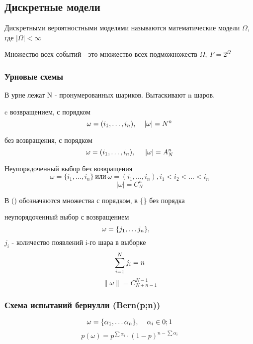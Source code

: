 \begin{multicols}{2}
    \subsection*{Дискретные модели}
    \begin{definition}{}{}
        Дискретными вероятностными моделями называются математические модели $\Omega$, где $ |\Omega|< \infty$
    \end{definition}
    Множество всех событий - это множество всех подможножеств $\Omega, \   F = 2^{\Omega}$
    \subsubsection*{Урновые схемы}
    В урне лежат N - пронумерованных шариков. Вытаскивают n шаров.
    \begin{enumerate*}
        \item c возвращением, с порядком
        \[
        \omega = (i_1,\ldots,i_n), \hspace*{0.4cm} |\omega| = N^n
        \]
        \item без возвращения, с порядком
        \[
        \omega = (i_1,\ldots,i_n), \hspace*{0.5cm} |\omega| = A_N^n
        \]
        \item Неупорядоченный выбор без возвращения
        \[  
        \omega = \{i_1,\ldots,i_n\}\ \text{или} \ \omega = (i_1,\ldots,i_n), i_1<i_2<...<i_n
        \]
        \[
        |\omega| = C_N^n
        \]
        \begin{note}
        В () обозначаются множества с порядком, в \{\} без порядка
        \end{note}
        \item неупорядоченный выбор с возвращением
        \[
        \omega = \{j_1,\ldots j_n\}, \hspace*{0.4cm}
        \]
        $j_i$ - количество появлений i-го шара в выборке
        \[
        \sum\limits_{i = 1}^{N} j_i = n
        \]
        \[
        \|\omega\| = C_{N+n-1}^{N-1}
        \]
    \end{enumerate*}
    \subsubsection*{Схема испытаний бернулли (Bern(p;n))}
    \[
        \omega = \{\alpha_1,\ldots \alpha_n\}, \hspace*{0.4cm} \alpha_i \in {0;1}
    \]
    \[
        p(\omega ) = p^{\sum \alpha_i}\cdot(1-p)^{n-\sum \alpha_i}
    \]
    

\end{multicols}
